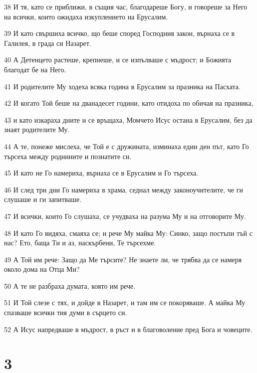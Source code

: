 \par 38 И тя, като се приближи, в същия час, благодареше Богу, и говореше за Него на всички, които ожидаха изкуплението на Ерусалим.
\par 39 И като свършиха всичко, що беше според Господния закон, върнаха се в Галилея, в града си Назарет.
\par 40 А Детенцето растеше, крепнеше, и се изпълваше с мъдрост; и Божията благодат бе на Него.
\par 41 И родителите Му ходеха всяка година в Ерусалим за празника на Пасхата.
\par 42 И когато Той беше на дванадесет години, като отидоха по обичая на празника,
\par 43 и като изкараха дните и се връщаха, Момчето Исус остана в Ерусалим, без да знаят родителите Му.
\par 44 А те, понеже мислеха, че Той е с дружината, изминаха един ден път, като Го търсеха между роднините и познатите си.
\par 45 И като не Го намериха, върнаха се в Ерусалим и Го търсеха.
\par 46 И след три дни Го намериха в храма, седнал между законоучителите, че ги слушаше и ги запитваше.
\par 47 И всички, които Го слушаха, се учудваха на разума Му и на отговорите Му.
\par 48 И като Го видяха, смаяха се; и рече Му майка Му: Синко, защо постъпи тъй с нас? Ето, баща Ти и аз, наскърбени, Те търсехме.
\par 49 А Той им рече: Защо да Ме търсите? Не знаете ли, че трябва да се намеря около дома на Отца Ми?
\par 50 А те не разбраха думата, която им рече.
\par 51 И Той слезе с тях, и дойде в Назарет, и там им се покоряваше. А майка Му спазваше всички тия думи в сърцето си.
\par 52 А Исус напредваше в мъдрост, в ръст и в благоволение пред Бога и човеците.

\chapter{3}

